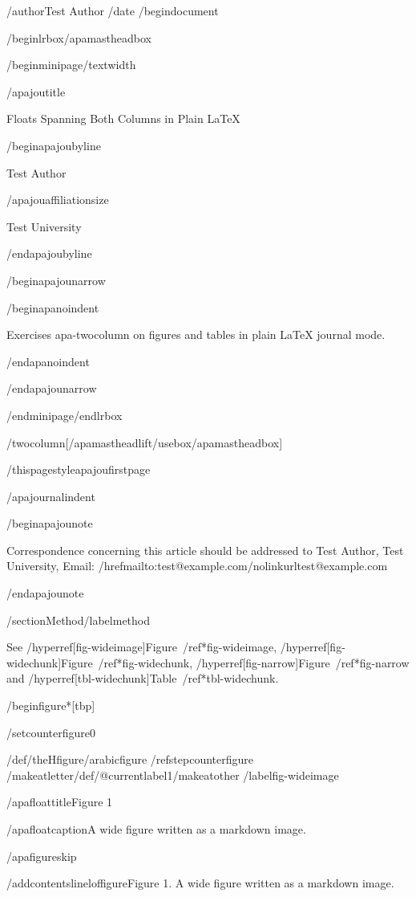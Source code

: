 /author{Test Author}
/date{}
/begin{document}


/begin{lrbox}{/apamastheadbox}%

/begin{minipage}{/textwidth}

/apajoutitle{

Floats Spanning Both Columns in Plain LaTeX

}

/begin{apajoubyline}

Test Author

/apajouaffiliationsize

Test University

/end{apajoubyline}

/begin{apajounarrow}

/begin{apanoindent}

Exercises apa-twocolumn on figures and tables in plain LaTeX journal
mode.

/end{apanoindent}

/end{apajounarrow}

/end{minipage}/end{lrbox}

/twocolumn[/apamastheadlift/usebox{/apamastheadbox}]

/thispagestyle{apajoufirstpage}

/apajournalindent

/begin{apajounote}

Correspondence concerning this article should be addressed to Test
Author, Test University, Email:
/href{mailto:test@example.com}{/nolinkurl{test@example.com}}

/end{apajounote}

/section{Method}/label{method}

See /hyperref[fig-wideimage]{Figure~/ref*{fig-wideimage}},
/hyperref[fig-widechunk]{Figure~/ref*{fig-widechunk}},
/hyperref[fig-narrow]{Figure~/ref*{fig-narrow}} and
/hyperref[tbl-widechunk]{Table~/ref*{tbl-widechunk}}.

/begin{figure*}[tbp]

/setcounter{figure}{0}

/def/theHfigure{/arabic{figure}}%
/refstepcounter{figure}%
/makeatletter/def/@currentlabel{1}/makeatother%
/label{fig-wideimage}

/apafloattitle{Figure 1}

/apafloatcaption{A wide figure written as a markdown image.}

/apafigureskip

/addcontentsline{lof}{figure}{Figure 1. A wide figure written as a
markdown image.}

